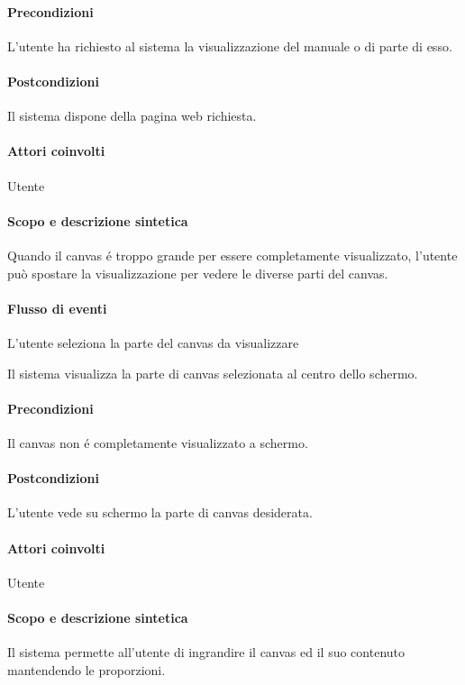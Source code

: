 \paragraph{Precondizioni} L'utente ha richiesto al sistema la visualizzazione del manuale o di parte di esso.
\paragraph{Postcondizioni} Il sistema dispone della pagina web richiesta.

\paragraph{Attori coinvolti} Utente
\paragraph{Scopo e descrizione sintetica}
Quando il canvas \'e troppo grande per essere completamente visualizzato, l'utente pu\`o spostare la visualizzazione per vedere le diverse parti del canvas.
\paragraph{Flusso di eventi}
\begin{elenconumerato}[\textbf{}]{\subsubsecindent}
\item L'utente seleziona la parte del canvas da visualizzare
\item Il sistema visualizza la parte di canvas selezionata al centro dello schermo.
\end{elenconumerato}
\paragraph{Precondizioni} Il canvas non \'e completamente visualizzato a schermo.
\paragraph{Postcondizioni} L'utente vede su schermo la parte di canvas desiderata.

\paragraph{Attori coinvolti} Utente
\paragraph{Scopo e descrizione sintetica} 
Il sistema permette all'utente di ingrandire il canvas ed il suo contenuto mantendendo le proporzioni.
